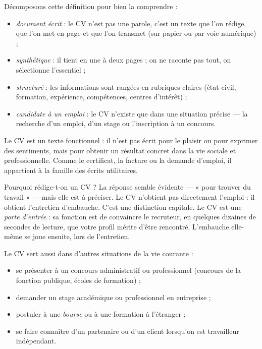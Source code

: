\documentclass[11pt]{article}
\newcommand{\cle}[1]{{\popxbold\color{popdark}#1}}
\newcounter{popsec}
\newcounter{popsub}
\newcommand{\courssub}[1]{%
  \stepcounter{popsub}%
  \par\vspace{9pt}\noindent{\popxbold\fontsize{11.5}{13}\selectfont\color{popink}{\color{poporange}\thepopsec.\thepopsub}\hspace{6pt}#1}\par\nopagebreak\vspace{4pt}
}
\begin{document}
Décomposons cette définition pour bien la comprendre :

\begin{itemize}
\item \emph{document écrit} : le CV n'est pas une parole, c'est un texte que l'on rédige, que l'on met en page et que l'on transmet (sur papier ou par voie numérique) ;
\item \emph{synthétique} : il tient en une à deux pages ; on ne raconte pas tout, on sélectionne l'essentiel ;
\item \emph{structuré} : les informations sont rangées en rubriques claires (état civil, formation, expérience, compétences, centres d'intérêt) ;
\item \emph{candidate à un emploi} : le CV n'existe que dans une situation précise — la recherche d'un emploi, d'un stage ou l'inscription à un concours.
\end{itemize}

\begin{aretenir}[L'essentiel]
Le CV est un \cle{texte fonctionnel} : il n'est pas écrit pour le plaisir ou pour exprimer des sentiments, mais pour obtenir un résultat concret dans la vie sociale et professionnelle. Comme le certificat, la facture ou la demande d'emploi, il appartient à la famille des écrits utilitaires.
\end{aretenir}

\courssub{La fonction du CV : à quoi sert-il ?}

Pourquoi rédige-t-on un CV ? La réponse semble évidente — « pour trouver du travail » — mais elle est à préciser. Le CV n'obtient pas directement l'emploi : il obtient \cle{l'entretien d'embauche}. C'est une distinction capitale. Le CV est une \emph{porte d'entrée} : sa fonction est de convaincre le recruteur, en quelques dizaines de secondes de lecture, que votre profil mérite d'être rencontré. L'embauche elle-même se joue ensuite, lors de l'entretien.

Le CV sert aussi dans d'autres situations de la vie courante :

\begin{itemize}
\item se présenter à un \cle{concours} administratif ou professionnel (concours de la fonction publique, écoles de formation) ;
\item demander un \cle{stage} académique ou professionnel en entreprise ;
\item postuler à une \emph{bourse} ou à une formation à l'étranger ;
\item se faire connaître d'un partenaire ou d'un client lorsqu'on est travailleur indépendant.
\end{itemize}
\end{document}
